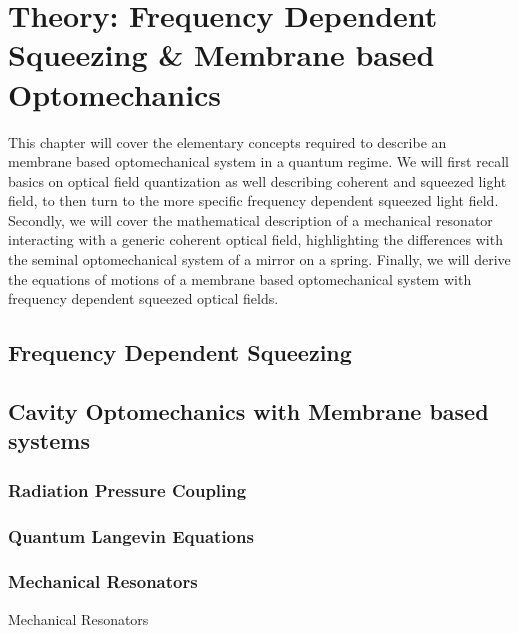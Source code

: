 \chapter{Theory: Frequency Dependent Squeezing \& Membrane based Optomechanics}
This chapter will cover the elementary concepts required to describe an membrane based optomechanical system in a quantum regime. We will first recall basics on optical field quantization as well describing coherent and squeezed light field, to then turn to the more specific frequency dependent squeezed light field. Secondly, we will cover the mathematical description of a mechanical resonator interacting with a generic coherent optical field, highlighting the differences with the seminal optomechanical system of a mirror on a spring. Finally, we will derive the equations of motions of a membrane based optomechanical system with frequency dependent squeezed optical fields. 
\minitoc
\newpage


\section{Frequency Dependent Squeezing}

\section{Cavity Optomechanics with Membrane based systems }
\subsection{Radiation Pressure Coupling}
\subsection{Quantum Langevin Equations}
\subsection{Mechanical Resonators}{Mechanical Resonators}
